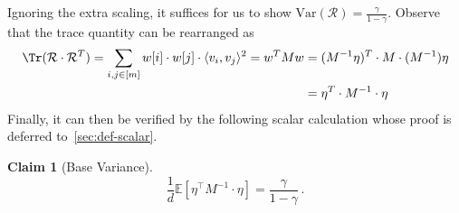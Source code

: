 \documentclass[12pt]{article}
\def \E {\mathbb{E}}
\newcommand{\Var}{\mathrm{Var}}
\def\1{\bm{1}}
\newtheorem{claim}[theorem]{Claim}
\newcommand{\calR}{\mathcal{R}}
\newcommand{\gam}{\gamma}
\newcommand{\Authornote}[3]{{\sf\footnotesize\color{#3}{[#1: #2]}}}
\newcommand{\Authornote}[3]{}
\newcommand{\jnote}[1]{\Authornote{Jeff}{#1}{blue}}
\begin{document}
Ignoring the extra scaling, it suffices for us to show $\Var(\calR)=\frac{\gamma}{1-\gamma} $. Observe that the trace quantity can be rearranged as \begin{align*}
 	\Tr(\calR \cdot \calR^T) = \sum_{i,j \in [m]} w[i] \cdot w[j] \cdot  \langle v_i, v_j\rangle^2 = w^T M w
 	&= (M^{-1} \eta)^T \cdot M \cdot  (M^{-1}) \eta   \\
 	&= \eta^T \cdot  M^{-1} \cdot  \eta 
 \end{align*}
Finally, it can then be verified by the following scalar calculation whose proof is deferred to~\cref{sec:def-scalar}. \begin{claim}[Base Variance] \label{clm:base-scalar-variance} 
	\[ 
	 \frac{1}{d} \E[\eta^\top M^{-1} \cdot \eta] = \frac{\gamma}{1-\gamma} \,.
	\]
\end{claim}
%
%
% 

 
\end{document}
